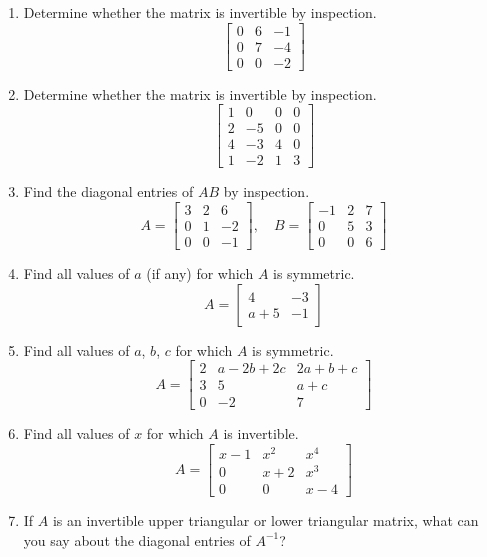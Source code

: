 \documentclass{article}
\theoremstyle{mystyle}
\begin{document}
\begin{enumerate}
    \item[19.] Determine whether the matrix is invertible by inspection.
    \[
    \begin{bmatrix}0&6&-1\\0&7&-4\\0&0&-2\end{bmatrix}
    \]

    \item[21.] Determine whether the matrix is invertible by inspection.
    \[
    \begin{bmatrix}1&0&0&0\\2&-5&0&0\\4&-3&4&0\\1&-2&1&3\end{bmatrix}
    \]

    \item[23.] Find the diagonal entries of $AB$ by inspection.
    \[
    A=\begin{bmatrix}3&2&6\\0&1&-2\\0&0&-1\end{bmatrix},\quad
    B=\begin{bmatrix}-1&2&7\\0&5&3\\0&0&6\end{bmatrix}
    \]

    \item[25.] Find all values of $a$ (if any) for which $A$ is symmetric.
    \[
    A=\begin{bmatrix}4&-3\\a+5&-1\end{bmatrix}
    \]

    \item[26.] Find all values of $a$, $b$, $c$ for which $A$ is symmetric.
    \[
    A=\begin{bmatrix}2&a-2b+2c&2a+b+c\\3&5&a+c\\0&-2&7\end{bmatrix}
    \]

    \item[27.] Find all values of $x$ for which $A$ is invertible.
    \[
    A=\begin{bmatrix}x-1&x^2&x^4\\0&x+2&x^3\\0&0&x-4\end{bmatrix}
    \]

    \item[29.] If $A$ is an invertible upper triangular or lower triangular matrix, what can you say about the diagonal entries of $A^{-1}$?


\end{enumerate}
\end{document}
